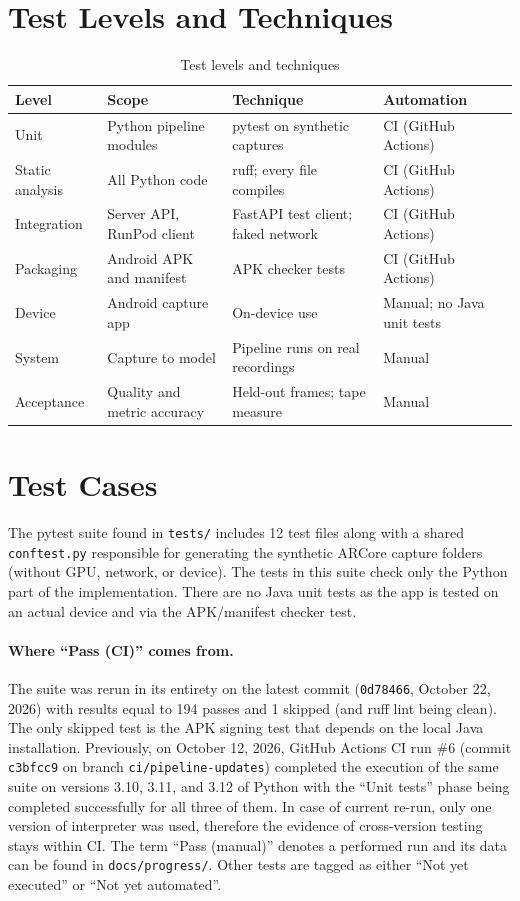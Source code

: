 \section{Test Levels and Techniques}

\begin{table}[htbp]
\centering
\small
\caption{Test levels and techniques}
\label{tab:testlevels}
\begin{tabular}{p{2.5cm}p{3cm}p{3cm}p{2.5cm}}
\toprule
\textbf{Level} & \textbf{Scope} & \textbf{Technique} & \textbf{Automation} \\
\midrule
Unit & Python pipeline modules & pytest on synthetic captures & CI (GitHub Actions) \\
Static analysis & All Python code & ruff; every file compiles & CI (GitHub Actions) \\
Integration & Server API, RunPod client & FastAPI test client; faked network & CI (GitHub Actions) \\
Packaging & Android APK and manifest & APK checker tests & CI (GitHub Actions) \\
Device & Android capture app & On-device use & Manual; no Java unit tests \\
System & Capture to model & Pipeline runs on real recordings & Manual \\
Acceptance & Quality and metric accuracy & Held-out frames; tape measure & Manual \\
\bottomrule
\end{tabular}
\end{table}

\section{Test Cases}

The pytest suite found in \texttt{tests/} includes 12 test files along with a shared \texttt{conftest.py} responsible for generating the synthetic ARCore capture folders (without GPU, network, or device). The tests in this suite check only the Python part of the implementation. There are no Java unit tests as the app is tested on an actual device and via the APK/manifest checker test.

\paragraph{Where ``Pass (CI)'' comes from.} The suite was rerun in its entirety on the latest commit (\texttt{0d78466}, October 22, 2026) with results equal to 194 passes and 1 skipped (and ruff lint being clean). The only skipped test is the APK signing test that depends on the local Java installation. Previously, on October 12, 2026, GitHub Actions CI run \#6 (commit \texttt{c3bfcc9} on branch \texttt{ci/pipeline-updates}) completed the execution of the same suite on versions 3.10, 3.11, and 3.12 of Python with the ``Unit tests'' phase being completed successfully for all three of them. In case of current re-run, only one version of interpreter was used, therefore the evidence of cross-version testing stays within CI. The term ``Pass (manual)'' denotes a performed run and its data can be found in \texttt{docs/progress/}. Other tests are tagged as either ``Not yet executed'' or ``Not yet automated''.


